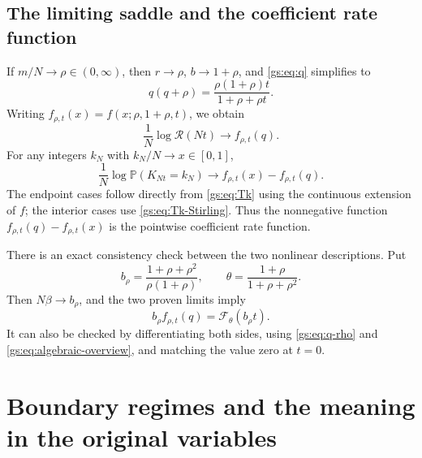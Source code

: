 \documentclass[11pt,a4paper]{article}
\numberwithin{equation}{section}
\theoremstyle{definition}
\theoremstyle{remark}
\newcommand{\Rgs}{\mathcal R}
\newcommand{\PP}{\mathbb P}
\newcommand{\calF}{\mathcal F}
\begin{document}
\subsection{The limiting saddle and the coefficient rate function}
If $m/N\to\rho\in(0,\infty)$, then $r\to\rho$, $b\to1+\rho$,
and \eqref{gs:eq:q} simplifies to
\begin{equation}\label{gs:eq:q-rho}
 q(q+\rho)=\frac{\rho(1+\rho)t}{1+\rho+\rho t}.
\end{equation}
Writing $f_{\rho,t}(x)=f(x;\rho,1+\rho,t)$, we obtain
\begin{equation}\label{gs:eq:free-saddle}
 \frac1N\log\Rgs(Nt)\longrightarrow f_{\rho,t}(q).
\end{equation}
For any integers $k_N$ with $k_N/N\to x\in[0,1]$,
\begin{equation}\label{gs:eq:mass-rate}
 \frac1N\log\PP(K_{Nt}=k_N)
 \longrightarrow f_{\rho,t}(x)-f_{\rho,t}(q).
\end{equation}
The endpoint cases follow directly from \eqref{gs:eq:Tk} using the continuous
extension of $f$; the interior cases use \eqref{gs:eq:Tk-Stirling}.
Thus the nonnegative function $f_{\rho,t}(q)-f_{\rho,t}(x)$ is the
pointwise coefficient rate function.

There is an exact consistency check between the two nonlinear descriptions.
Put
\begin{equation}
 b_\rho=\frac{1+\rho+\rho^2}{\rho(1+\rho)},\qquad
 \theta=\frac{1+\rho}{1+\rho+\rho^2}.
\end{equation}
Then $N\beta\to b_\rho$, and the two proven limits imply
\begin{equation}\label{gs:eq:consistency}
 b_\rho f_{\rho,t}(q)=\calF_\theta(b_\rho t).
\end{equation}
It can also be checked by differentiating both sides, using
\eqref{gs:eq:q-rho} and \eqref{gs:eq:algebraic-overview}, and matching the value
zero at $t=0$.

\section{Boundary regimes and the meaning in the original variables}
\label{gs:sec:boundaries}
\end{document}
